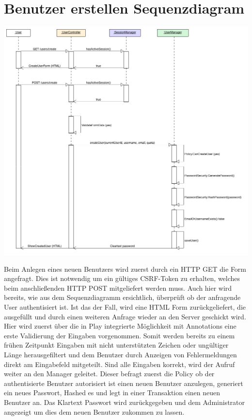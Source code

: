 \documentclass[12pt,DIV14,BCOR10mm,a4paper,parskip=half-,headsepline,headinclude,english,ngerman,bibliography=totocnumbered]{scrreprt}
\begin{document}
\section{Benutzer erstellen Sequenzdiagram}

\includegraphics[width=0.7\paperwidth]{resources/createuserseq_diagram.png}

Beim Anlegen eines neuen Benutzers wird zuerst durch ein HTTP GET die Form angefragt. Dies ist notwendig um ein gültiges CSRF-Token zu erhalten, welches beim anschließenden HTTP POST mitgeliefert werden muss. Auch hier wird bereits, wie aus dem Sequenzdiagramm ersichtlich, überprüft ob der anfragende User authentisiert ist. Ist das der Fall, wird eine HTML Form zurückgeliefert, die ausgefüllt und durch einen weiteren Anfrage wieder an den Server geschickt wird. Hier wird zuerst über die in Play integrierte Möglichkeit mit Annotations eine erste Validierung der Eingaben vorgenommen. Somit werden bereits zu einem frühen Zeitpunkt Eingaben mit nicht unterstützten Zeichen oder ungültiger Länge herausgefiltert und dem Benutzer durch Anzeigen von Fehlermeldungen direkt am Eingabefeld mitgeteilt. Sind alle Eingaben korrekt, wird der Aufruf weiter an den Manager geleitet. Dieser befragt zuerst die Policy ob der authentisierte Benutzer autorisiert ist einen neuen Benutzer anzulegen, generiert ein neues Passwort, Hashed es und legt in einer Transaktion einen neuen Benutzer an. Das Klartext Passwort wird zurückgegeben und dem Administrator angezeigt um dies dem neuen Benutzer zukommen zu lassen.
\end{document}
